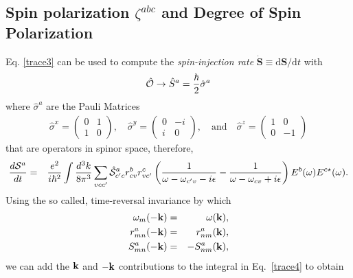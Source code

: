 \documentclass[floatfix,prb,aps,superscriptaddress,11pt]{revtex4}
\begin{document}
\subsection{Spin polarization $\zeta^{abc}$ and Degree of Spin Polarization}\label{sec:DSP} 
Eq. \eqref{trace3} can be used to compute the
\textit{spin-injection rate} 
$\dot{\bm{S}} \equiv\mathrm{d}\bm{S}/\mathrm{d}t$ with
\begin{eqnarray}\label{eq:Shat}
\hat{\cal O}\to
\hat{S}^a=\frac{\hbar}{2}\hat{\sigma}^a
\end{eqnarray}
where $\hat{\sigma}^a$ are the Pauli Matrices
\begin{eqnarray}\label{eq:pauliMatrix}
\hat\sigma^x=\left(\begin{array}{cc} 
0 & 1 \\ 
1 & 0  
\end{array}\right)  
,\quad  
\hat\sigma^y=\left(\begin{array}{cc} 
0  & -i \\ 
i & 0  
\end{array}\right)  
,\quad \text{and}\quad  
\hat\sigma^z=\left(\begin{array}{cc} 
1 & 0 \\ 
0 & -1  
\end{array}\right)  
\end{eqnarray} 
that are operators in spinor space, therefore, 
\begin{eqnarray}\label{trace4}
\frac{d{\cal S}^a}{dt}
&=&
\frac{e^2}{i\hbar^2}
\int\frac{d^3k}{8\pi^3}
\sum_{vcc'}
\hat{\cal S}^a_{c'c}r^b_{cv}r^c_{vc'}
\left(
\frac{1}{\omega-\omega_{c'v}-i\epsilon}
-
\frac{1}
{\omega-\omega_{cv}+i\epsilon}
\right)
E^b(\omega)E^{c\star}(\omega)
.
\end{eqnarray} 
Using the so called,%
time-reversal invariance by which
\begin{eqnarray}\label{timer}
\omega_m(-\mathbf{k})&=&\omega(\mathbf{k}),
\nonumber \\
r^a_{mn}(-\mathbf{k})&=&r^a_{nm}(\mathbf{k}),
\nonumber \\
S^a_{mn}(-\mathbf{k})&=&-S^a_{nm}(\mathbf{k}),
\end{eqnarray}
we can add the $\mathbf{k}$ and $-\mathbf{k}$ contributions to the integral in
Eq.~\eqref{trace4} to obtain 
\end{document}
